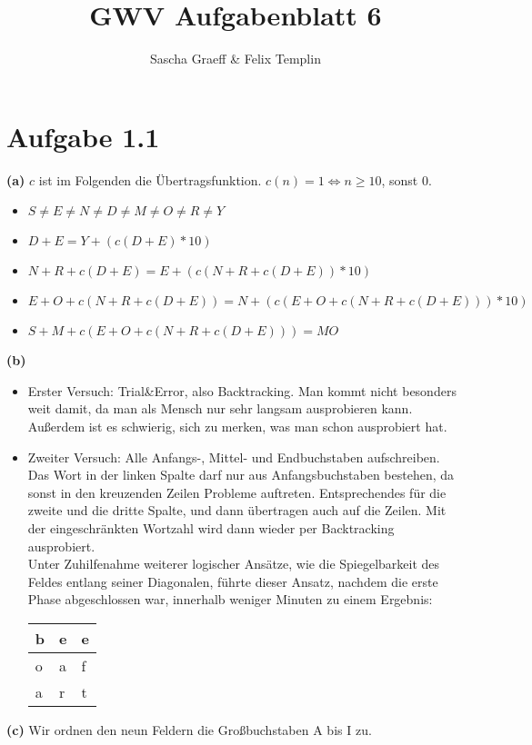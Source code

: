 \documentclass[a4paper,10pt]{article}
\title{GWV Aufgabenblatt 6}
\author{Sascha Graeff \& Felix Templin}
\begin{document}
\maketitle

\section*{Aufgabe 1.1}
\textbf{(a)}
$c$ ist im Folgenden die Übertragsfunktion. $c(n) = 1 \Leftrightarrow n \geq 10$, sonst $0$.
 \begin{itemize}
  \item $S \neq E \neq N \neq D \neq M \neq O \neq R \neq  Y$
  \item $D + E = Y + (c(D+E) * 10)$
  \item $N + R + c(D+E) = E + (c(N + R + c(D+E)) * 10)$
  \item $E + O + c(N + R + c(D+E)) = N + (c(E + O + c(N + R + c(D+E))) * 10)$
  \item $S + M + c(E + O + c(N + R + c(D+E))) = MO$
 \end{itemize}
\textbf{(b)}
\begin{itemize}
  \item Erster Versuch: Trial\&Error, also Backtracking. Man kommt nicht besonders weit damit, da man als Mensch nur sehr langsam ausprobieren kann. Außerdem ist es schwierig, sich zu merken, was man schon ausprobiert hat.
  \item Zweiter Versuch: Alle Anfangs-, Mittel- und Endbuchstaben aufschreiben. Das Wort in der linken Spalte darf nur aus Anfangsbuchstaben bestehen, da sonst in den kreuzenden Zeilen Probleme auftreten.
          Entsprechendes für die zweite und die dritte Spalte, und dann übertragen auch auf die Zeilen.
          Mit der eingeschränkten Wortzahl wird dann wieder per Backtracking ausprobiert.\\
          Unter Zuhilfenahme weiterer logischer Ansätze, wie die Spiegelbarkeit des Feldes entlang seiner Diagonalen, führte dieser Ansatz, nachdem die erste Phase abgeschlossen war, innerhalb weniger Minuten zu einem Ergebnis:

\begin{tabular}{ | l | l | l | }
\hline
b & e & e \\ \hline
o & a & f \\ \hline
a & r & t \\ \hline
\end{tabular}
\end{itemize}
\newpage
\noindent \textbf{(c) }
Wir ordnen den neun Feldern die Großbuchstaben A bis I zu.
\end{document}
